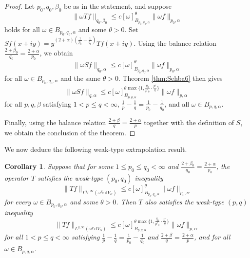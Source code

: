 \documentclass[a4paper,11pt,intlimits,oneside]{amsart}
\newtheorem{corollary}[theorem]{Corollary}
\theoremstyle{definition}
\numberwithin{equation}{section}
\theoremstyle{definition}
\begin{document}
\begin{proof}
Let $p_0,q_0,\beta_0$ be as in the statement, and suppose
$$\|\omega Tf\|_{q_0,\beta_0}\le c[\omega]^{\theta}_{B_{p_0,q_0,\alpha}}\|\omega f\|_{p_0,\alpha}$$
holds for all $\omega\in B_{p_0,q_0,\alpha}$ and some $\theta>0$. Set $Sf(x+iy)=y^{(2+\alpha)\left(\frac{1}{p_0}-\frac{1}{q_0}\right)}Tf(x+iy)$. Using the balance relation
$\frac{2+\beta_0}{q_0}= \frac{2+\alpha}{p_0}$, we obtain
$$\|\omega Sf\|_{q_0,\alpha}\le c[\omega]^{\theta}_{B_{p_0,q_0,\alpha}}\|\omega f\|_{p_0,\alpha}$$
for all $\omega\in B_{p_0,q_0,\alpha}$ and the same $\theta>0$. Theorem \ref{thm:Sehba6} then gives
$$\|\omega Sf\|_{q,\alpha}\le c[\omega]^{\theta\max\{1,\frac{q_0}{p'_0}\cdot\frac{p'}{q}\}}_{B_{p,q,\alpha}}\|\omega f\|_{p,\alpha}$$
for all $p,q,\beta$ satisfying $1<p\le q<\infty$, $\frac{1}{p} - \frac{1}{q} = \frac{1}{p_0} - \frac{1}{q_0}$, and all $\omega\in B_{p,q,\alpha}$.

Finally, using the balance relation $\frac{2+\beta}{q} = \frac{2+\alpha}{p}$ together with the definition of $S$, we obtain the conclusion of the theorem.
\end{proof}
We now deduce the following weak-type extrapolation result.
\begin{corollary}\label{cor:weaksharpextra}
Suppose that for some $1\le p_0\le q_0<\infty$ and $\frac{2+\beta_0}{q_0}= \frac{2+\alpha}{p_0}$, the operator $T$ satisfies the weak-type $(p_0,q_0)$ inequality
$$\| Tf\|_{L^{q_0,\infty}(\omega^{q_0}\,\mathrm{d}V_{\alpha})}\le c[\omega]_{B_{p_0,q_0,\alpha}}^{\theta}\|\omega f\|_{p_0,\alpha}$$
for every $\omega\in B_{p_0,q_0,\alpha}$ and some $\theta>0$. Then $T$ also satisfies the weak-type $(p,q)$ inequality
$$\| Tf\|_{L^{q,\infty}(\omega^{q}\,\mathrm{d}V_{\alpha})}\le c[\omega]_{B_{p,q,\alpha}}^{\theta\max\{1,\frac{q_0}{p'_0}\cdot\frac{p'}{q}\}}\|\omega f\|_{p,\alpha}$$
for all $1<p\le q<\infty$ satisfying $\frac{1}{p}-\frac{1}{q} = \frac{1}{p_0} - \frac{1}{q_0}$ and $\frac{2+\beta}{q} = \frac{2+\alpha}{p}$, and for all $\omega\in B_{p,q,\alpha}$.
\end{corollary}
\end{document}
